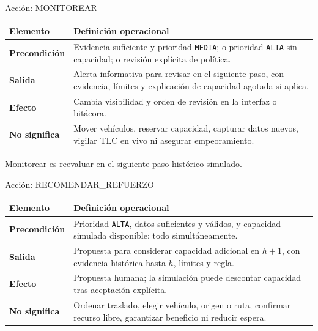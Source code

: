 \documentclass[aspectratio=169,11pt]{beamer}
\newcommand{\accion}[1]{\texttt{#1}}
\begin{document}
\begin{frame}{Acción: MONITOREAR}
  \small
  \begin{tabularx}{\textwidth}{>{\bfseries}p{}X}
    \toprule
    Elemento & Definición operacional \\\midrule
    Precondición & Evidencia suficiente y prioridad \accion{MEDIA}; o prioridad \accion{ALTA} sin capacidad; o revisión explícita de política. \\
    Salida & Alerta informativa para revisar en el siguiente paso, con evidencia, límites y explicación de capacidad agotada si aplica. \\
    Efecto & Cambia visibilidad y orden de revisión en la interfaz o bitácora. \\
    No significa & Mover vehículos, reservar capacidad, capturar datos nuevos, vigilar TLC en vivo ni asegurar empeoramiento. \\
    \bottomrule
  \end{tabularx}
  \alert{Monitorear es reevaluar en el siguiente paso histórico simulado.}
\end{frame}

\begin{frame}{Acción: RECOMENDAR\_REFUERZO}
  \small
  \begin{tabularx}{\textwidth}{>{\bfseries}p{}X}
    \toprule
    Elemento & Definición operacional \\\midrule
    Precondición & Prioridad \accion{ALTA}, datos suficientes y válidos, y capacidad simulada disponible: todo simultáneamente. \\
    Salida & Propuesta para considerar capacidad adicional en $h+1$, con evidencia histórica hasta $h$, límites y regla. \\
    Efecto & Propuesta humana; la simulación puede descontar capacidad tras aceptación explícita. \\
    No significa & Ordenar traslado, elegir vehículo, origen o ruta, confirmar recurso libre, garantizar beneficio ni reducir espera. \\
    \bottomrule
  \end{tabularx}
\end{frame}
\end{document}
